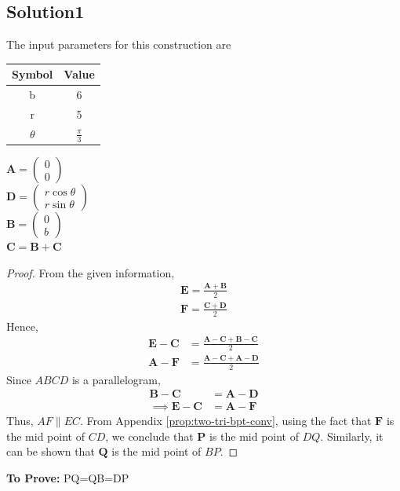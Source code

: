\documentclass[10pt, a4paper]{article}
\newcommand{\myvec}[1]{\ensuremath{\begin{pmatrix}#1\end{pmatrix}}}
\let\vec\mathbf
\begin{document}
\begin{center}
   \section{Solution1}

The input parameters for this construction are 
\begin{center}
\begin{tabular}{|c|c|}
	\hline
	\textbf{Symbol}&\textbf{Value}\\
	\hline
	b&6\\
	\hline
	r&5\\
	\hline
	$\theta$&$\frac{\pi}{3}$\\
	\hline
\end{tabular}
\begin{center}
$\vec{A}=\myvec{0\\0}$\\
$\vec{D}=\myvec{r\cos\theta \\ r\sin\theta}$\\
$\vec{B}=\myvec{0\\b}$\\
$\vec{C} = \vec{B}+\vec{C}$\\
\fi
\begin{proof}
From the given information,
	\begin{align}
		\vec{E}=\frac{\vec{A}+\vec{B}}{2}\\
\vec{F}=\frac{\vec{C}+\vec{D}}{2}
	\end{align}
	Hence, 
	\begin{align}
		\vec{E}-\vec{C}&=\frac{\vec{A}-\vec{C}+\vec{B}-\vec{C}}{2}\\
		\vec{A}-\vec{F}&=\frac{\vec{A}-\vec{C}+\vec{A}-\vec{D}}{2}
	\end{align}
	Since $ABCD$ is a parallelogram,
	\begin{align}
		\vec{B}-\vec{C} &= 
	\vec{A}-\vec{D}
	\\
	\implies 
		\vec{E}-\vec{C} &=
\vec{A}-\vec{F}
	\end{align}
	Thus, $AF \parallel EC$.  From Appendix
	  \ref{prop:two-tri-bpt-conv},  using the fact that $\vec{F}$ is the mid point of $CD$, we conclude that $\vec{P}$ is the mid point of $DQ$.  Similarly, it can be shown that $\vec{Q}$ is the mid point of $BP$.
\end{proof}
\iffalse
\end{center}
\end{center}
\textbf{To Prove:} PQ=QB=DP
		\begin{center}

\end{center}
\end{center}
\end{document}
